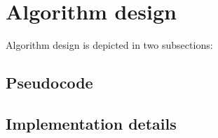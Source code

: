 \section{Algorithm design}
Algorithm design is depicted in two subsections:

\subsection{Pseudocode}

\subsection{Implementation details}


